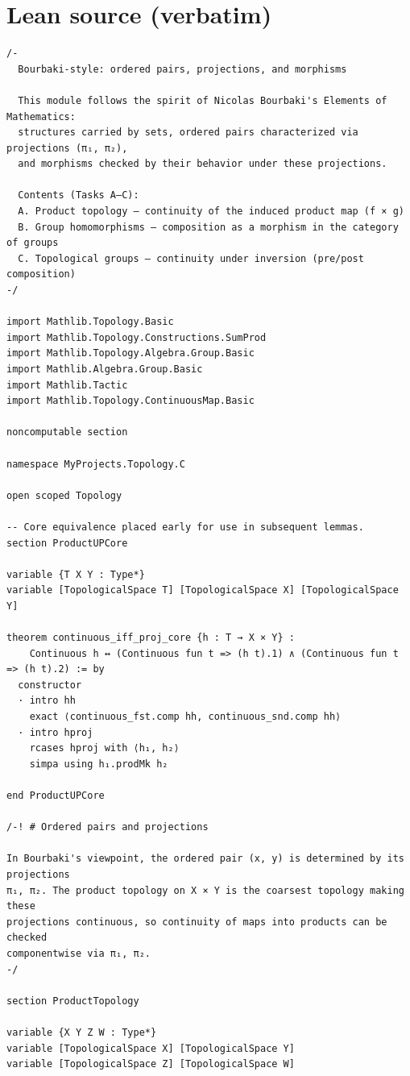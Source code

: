 \documentclass[12pt]{article}
\begin{document}
\section*{Lean source (verbatim)}
\begin{lstlisting}
/-
  Bourbaki-style: ordered pairs, projections, and morphisms

  This module follows the spirit of Nicolas Bourbaki's Elements of Mathematics:
  structures carried by sets, ordered pairs characterized via projections (π₁, π₂),
  and morphisms checked by their behavior under these projections.

  Contents (Tasks A–C):
  A. Product topology — continuity of the induced product map (f × g)
  B. Group homomorphisms — composition as a morphism in the category of groups
  C. Topological groups — continuity under inversion (pre/post composition)
-/

import Mathlib.Topology.Basic
import Mathlib.Topology.Constructions.SumProd
import Mathlib.Topology.Algebra.Group.Basic
import Mathlib.Algebra.Group.Basic
import Mathlib.Tactic
import Mathlib.Topology.ContinuousMap.Basic

noncomputable section

namespace MyProjects.Topology.C

open scoped Topology

-- Core equivalence placed early for use in subsequent lemmas.
section ProductUPCore

variable {T X Y : Type*}
variable [TopologicalSpace T] [TopologicalSpace X] [TopologicalSpace Y]

theorem continuous_iff_proj_core {h : T → X × Y} :
    Continuous h ↔ (Continuous fun t => (h t).1) ∧ (Continuous fun t => (h t).2) := by
  constructor
  · intro hh
    exact ⟨continuous_fst.comp hh, continuous_snd.comp hh⟩
  · intro hproj
    rcases hproj with ⟨h₁, h₂⟩
    simpa using h₁.prodMk h₂

end ProductUPCore

/-! # Ordered pairs and projections

In Bourbaki's viewpoint, the ordered pair (x, y) is determined by its projections
π₁, π₂. The product topology on X × Y is the coarsest topology making these
projections continuous, so continuity of maps into products can be checked
componentwise via π₁, π₂.
-/

section ProductTopology

variable {X Y Z W : Type*}
variable [TopologicalSpace X] [TopologicalSpace Y]
variable [TopologicalSpace Z] [TopologicalSpace W]


\end{lstlisting}
\end{document}
